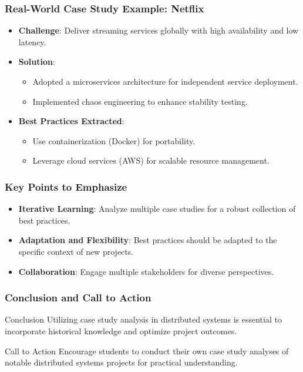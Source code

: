 \documentclass[aspectratio=169]{beamer}
\begin{document}
\begin{frame}[fragile]
  \frametitle{Real-World Case Study Example: Netflix}
  \begin{itemize}
    \item \textbf{Challenge}: Deliver streaming services globally with high availability and low latency.
    \item \textbf{Solution}:
      \begin{itemize}
        \item Adopted a microservices architecture for independent service deployment.
        \item Implemented chaos engineering to enhance stability testing.
      \end{itemize}
    \item \textbf{Best Practices Extracted}:
      \begin{itemize}
        \item Use containerization (Docker) for portability.
        \item Leverage cloud services (AWS) for scalable resource management.
      \end{itemize}
  \end{itemize}
\end{frame}

\begin{frame}[fragile]
  \frametitle{Key Points to Emphasize}
  \begin{itemize}
    \item \textbf{Iterative Learning}: Analyze multiple case studies for a robust collection of best practices.
    \item \textbf{Adaptation and Flexibility}: Best practices should be adapted to the specific context of new projects.
    \item \textbf{Collaboration}: Engage multiple stakeholders for diverse perspectives.
  \end{itemize}
\end{frame}

\begin{frame}[fragile]
  \frametitle{Conclusion and Call to Action}
  \begin{block}{Conclusion}
    Utilizing case study analysis in distributed systems is essential to incorporate historical knowledge and optimize project outcomes.
  \end{block}
  \begin{block}{Call to Action}
    Encourage students to conduct their own case study analyses of notable distributed systems projects for practical understanding.
  \end{block}
\end{frame}
\end{document}
